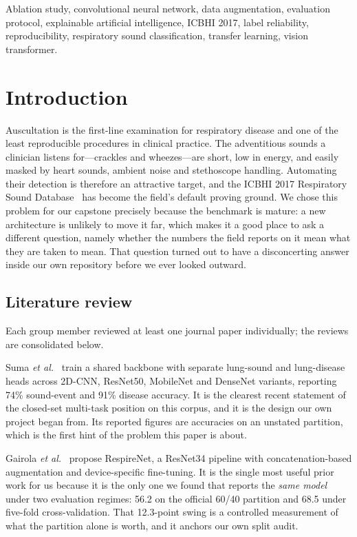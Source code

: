 \documentclass[journal,onecolumn]{IEEEtran}
\begin{document}
\begin{IEEEkeywords}
Ablation study, convolutional neural network, data augmentation, evaluation
protocol, explainable artificial intelligence, ICBHI 2017, label reliability,
reproducibility, respiratory sound classification, transfer learning, vision
transformer.
\end{IEEEkeywords}

\section{Introduction}
\label{sec:intro}

Auscultation is the first-line examination for respiratory disease and one of the
least reproducible procedures in clinical practice. The adventitious sounds a
clinician listens for---crackles and wheezes---are short, low in energy, and
easily masked by heart sounds, ambient noise and stethoscope handling. Automating
their detection is therefore an attractive target, and the ICBHI 2017 Respiratory
Sound Database~\cite{rocha2019icbhi} has become the field's default proving
ground. We chose this problem for our capstone precisely because the benchmark is
mature: a new architecture is unlikely to move it far, which makes it a good place
to ask a different question, namely whether the numbers the field reports on it
mean what they are taken to mean. That question turned out to have a
disconcerting answer inside our own repository before we ever looked outward.

\subsection*{Literature review}

Each group member reviewed at least one journal paper individually; the reviews
are consolidated below.

Suma \emph{et al.}~\cite{suma2025mtl} train a shared backbone with separate
lung-sound and lung-disease heads across 2D-CNN, ResNet50, MobileNet and DenseNet
variants, reporting 74\% sound-event and 91\% disease accuracy. It is the
clearest recent statement of the closed-set multi-task position on this corpus,
and it is the design our own project began from. Its reported figures are
accuracies on an unstated partition, which is the first hint of the problem this
paper is about.

Gairola \emph{et al.}~\cite{respirenet2021} propose RespireNet, a ResNet34
pipeline with concatenation-based augmentation and device-specific fine-tuning.
It is the single most useful prior work for us because it is the only one we
found that reports the \emph{same model} under two evaluation regimes: 56.2 on
the official 60/40 partition and 68.5 under five-fold cross-validation. That
12.3-point swing is a controlled measurement of what the partition alone is
worth, and it anchors our own split audit.
\end{document}
